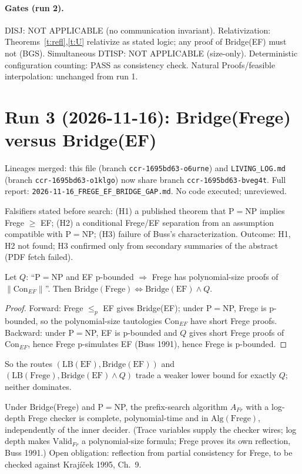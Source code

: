 \documentclass[11pt]{article}
\begin{document}
\paragraph{Gates (run 2).} DISJ: NOT APPLICABLE (no communication invariant).
Relativization: Theorems~\ref{t:refl},\ref{t:U} relativize as stated logic; any proof of
Bridge(EF) must not (BGS). Simultaneous DTISP: NOT APPLICABLE (size-only). Deterministic
configuration counting: PASS as consistency check. Natural Proofs/feasible interpolation:
unchanged from run 1.

\section{Run 3 (2026-11-16): Bridge(Frege) versus Bridge(EF)}
Lineages merged: this file (branch \texttt{ccr-1695bd63-o6urne}) and \texttt{LIVING\_LOG.md}
(branch \texttt{ccr-1695bd63-o1klgo}) now share branch \texttt{ccr-1695bd63-bveg4t}. Full report:
\texttt{2026-11-16\_FREGE\_EF\_BRIDGE\_GAP.md}. No code executed; unreviewed.

Falsifiers stated before search: (H1) a published theorem that P$=$NP implies Frege $\ge$ EF;
(H2) a conditional Frege/EF separation from an assumption compatible with P$=$NP;
(H3) failure of Buss's characterization. Outcome: H1, H2 not found; H3 confirmed only from
secondary summaries of the abstract (PDF fetch failed).

\begin{theorem}\label{t:gap}
Let $Q$: ``P$=$NP and EF p-bounded $\Rightarrow$ Frege has polynomial-size proofs of
$\|\mathrm{Con}_{EF}\|$''. Then $\mathrm{Bridge}(\mathrm{Frege})\iff\mathrm{Bridge}(\mathrm{EF})\wedge Q$.
\end{theorem}
\begin{proof}
Forward: Frege $\le_p$ EF gives Bridge(EF); under P$=$NP, Frege is p-bounded, so the
polynomial-size tautologies $\mathrm{Con}_{EF}$ have short Frege proofs. Backward: under P$=$NP,
EF is p-bounded and $Q$ gives short Frege proofs of $\mathrm{Con}_{EF}$, hence Frege
p-simulates EF (Buss 1991), hence Frege is p-bounded.
\end{proof}
So the routes $(\mathrm{LB}(\mathrm{EF}),\mathrm{Bridge}(\mathrm{EF}))$ and
$(\mathrm{LB}(\mathrm{Frege}),\mathrm{Bridge}(\mathrm{EF})\wedge Q)$ trade a weaker lower bound
for exactly $Q$; neither dominates.

\begin{theorem}\label{t:frU}
Under Bridge(Frege) and P$=$NP, the prefix-search algorithm $A_{Fr}$ with a log-depth Frege
checker is complete, polynomial-time and in $\mathrm{Alg}(\mathrm{Frege})$, independently of the
inner decider. (Trace variables supply the checker wires; log depth makes $\mathrm{Valid}_{Fr}$
a polynomial-size formula; Frege proves its own reflection, Buss 1991.) Open obligation:
reflection from partial consistency for Frege, to be checked against Kraj\'i\v{c}ek 1995, Ch.~9.
\end{theorem}
\end{document}
